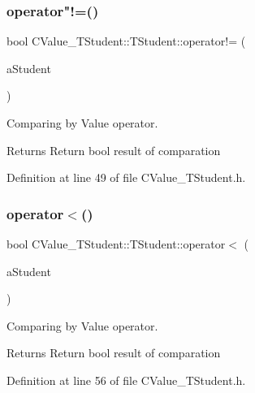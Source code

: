 \subsubsection{\texorpdfstring{operator"!=()}{operator!=()}}
{\footnotesize\ttfamily bool C\+Value\+\_\+\+T\+Student\+::\+T\+Student\+::operator!= (\begin{DoxyParamCaption}\item[{const \hyperlink{struct_c_value___t_student_1_1_t_student}{T\+Student} \&}]{a\+Student }\end{DoxyParamCaption})\hspace{0.3cm}{\ttfamily [inline]}}



Comparing by Value operator. 

\begin{DoxyReturn}{Returns}
Return {\ttfamily bool} result of comparation 
\end{DoxyReturn}


Definition at line 49 of file C\+Value\+\_\+\+T\+Student.\+h.

\mbox{\label{struct_c_value___t_student_1_1_t_student_a0e70d174799ef62209bfd2719077f127}} 
\subsubsection{\texorpdfstring{operator$<$()}{operator<()}}
{\footnotesize\ttfamily bool C\+Value\+\_\+\+T\+Student\+::\+T\+Student\+::operator$<$ (\begin{DoxyParamCaption}\item[{const \hyperlink{struct_c_value___t_student_1_1_t_student}{T\+Student} \&}]{a\+Student }\end{DoxyParamCaption})\hspace{0.3cm}{\ttfamily [inline]}}



Comparing by Value operator. 

\begin{DoxyReturn}{Returns}
Return {\ttfamily bool} result of comparation 
\end{DoxyReturn}


Definition at line 56 of file C\+Value\+\_\+\+T\+Student.\+h.

